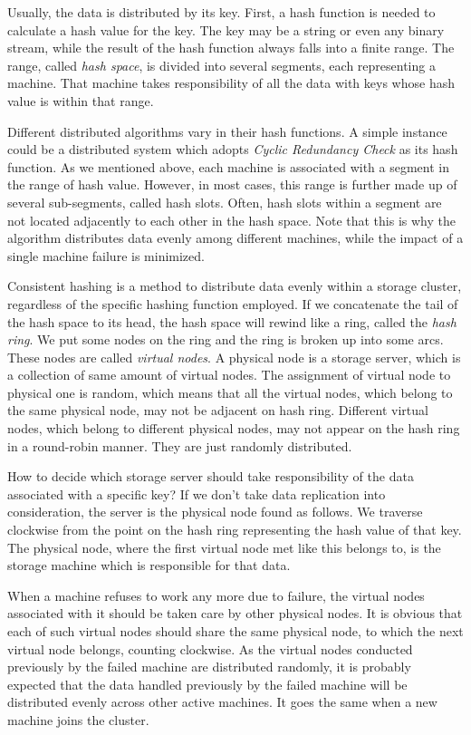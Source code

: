 Usually, the data is distributed by its key. First, a hash function is needed
to calculate a hash value for the key. The key may be a string or even any
binary stream, while the result of the hash function always falls into a
finite range. The range, called \emph{hash space}, is divided into several
segments, each representing a machine. That machine takes responsibility of
all the data with keys whose hash value is within that range.

Different distributed algorithms vary in their hash functions. A simple
instance could be a distributed system which adopts \emph{Cyclic Redundancy
Check} as its hash function. As we mentioned above, each machine is associated
with a segment in the range of hash value. However, in most cases, this range
is further made up of several sub-segments, called hash slots. Often, hash
slots within a segment are not located adjacently to each other in the hash
space. Note that this is why the algorithm distributes data evenly among
different machines, while the impact of a single machine failure is minimized.

Consistent hashing is a method to distribute data evenly within a storage
cluster, regardless of the specific hashing function employed. If we
concatenate the tail of the hash space to its head, the hash space will rewind
like a ring, called the \emph{hash ring}. We put some nodes on the ring and
the ring is broken up into some arcs. These nodes are called \emph{virtual
nodes}. A physical node is a storage server, which is a collection of same
amount of virtual nodes. The assignment of virtual node to physical one is
random, which means that all the virtual nodes, which belong to the same
physical node, may not be adjacent on hash ring. Different virtual nodes,
which belong to different physical nodes, may not appear on the hash ring in a
round-robin manner. They are just randomly distributed.
    
How to decide which storage server should take responsibility of the data
associated with a specific key? If we don't take data replication into
consideration, the server is the physical node found as follows. We traverse
clockwise from the point on the hash ring representing the hash value of that
key. The physical node, where the first virtual node met like this belongs to,
is the storage machine which is responsible for that data.

When a machine refuses to work any more due to failure, the virtual nodes
associated with it should be taken care by other physical nodes. It is obvious
that each of such virtual nodes should share the same physical node, to which
the next virtual node belongs, counting clockwise. As the virtual nodes
conducted previously by the failed machine are distributed randomly, it is
probably expected that the data handled previously by the failed machine will
be distributed evenly across other active machines. It goes the same when a
new machine joins the cluster.

